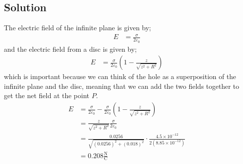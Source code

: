 \documentclass{article}
\newcommand{\N}{\text{N}}
\newcommand{\C}{\text{C}}
\begin{document}
\subsection*{Solution}
The electric field of the infinite plane is given by;
\begin{align*}
    E &= \frac{\sigma}{2\varepsilon_0}
\end{align*}
and the electric field from a disc is given by;
\begin{align*}
    E &= \frac{\sigma}{2\varepsilon_0}\left(1 - \frac{z}{\sqrt{z^2 + R^2}}\right)
\end{align*}
which is important because we can think of the hole as a superposition of the infinite plane and the disc, meaning that we can add the two fields together to get the net field at the point $P$.
\begin{align*}
    E &= \frac{\sigma}{2\varepsilon_0} - \frac{\sigma}{2\varepsilon_0}\left(1 - \frac{z}{\sqrt{z^2 + R^2}}\right) \\
    &= \frac{z}{\sqrt{z^2 + R^2}}\frac{\sigma}{2\varepsilon_0} \\
    &= \frac{0.0256}{\sqrt{(0.0256)^2 + (0.018)^2}}\cdot\frac{4.5 \times 10^{-12}}{2\left(8.85 \times 10^{-12}\right)} \\
    &= \boxed{0.208 \frac{\N}{\C}}
\end{align*}

\end{document}

